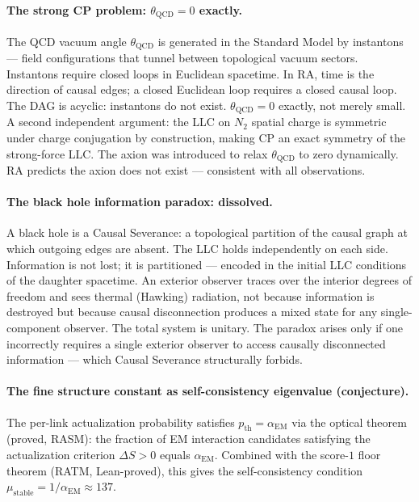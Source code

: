 \documentclass[11pt,a4paper]{article}
\begin{document}
\paragraph{The strong CP problem: $\theta_{\mathrm{QCD}} = 0$ exactly.}
The QCD vacuum angle $\theta_{\mathrm{QCD}}$ is generated in the Standard
Model by instantons — field configurations that tunnel between topological
vacuum sectors. Instantons require closed loops in Euclidean spacetime.
In RA, time is the direction of causal edges; a closed Euclidean loop
requires a closed causal loop. The DAG is acyclic: instantons do not exist.
$\theta_{\mathrm{QCD}} = 0$ exactly, not merely small. A second independent
argument: the LLC on $N_2$ spatial charge is symmetric under charge conjugation
by construction, making CP an exact symmetry of the strong-force LLC.
The axion was introduced to relax $\theta_{\mathrm{QCD}}$ to zero dynamically.
RA predicts the axion does not exist — consistent with all observations.

\paragraph{The black hole information paradox: dissolved.}
A black hole is a Causal Severance: a topological partition of the causal
graph at which outgoing edges are absent. The LLC holds independently on
each side. Information is not lost; it is partitioned — encoded in the
initial LLC conditions of the daughter spacetime. An exterior observer
traces over the interior degrees of freedom and sees thermal (Hawking)
radiation, not because information is destroyed but because causal
disconnection produces a mixed state for any single-component observer.
The total system is unitary. The paradox arises only if one incorrectly
requires a single exterior observer to access causally disconnected
information — which Causal Severance structurally forbids.

\paragraph{The fine structure constant as self-consistency eigenvalue (conjecture).}
The per-link actualization probability satisfies $p_{\mathrm{th}} = \alpha_{\mathrm{EM}}$
via the optical theorem (proved, RASM): the fraction of EM interaction candidates
satisfying the actualization criterion $\Delta S > 0$ equals $\alpha_{\mathrm{EM}}$.
Combined with the score-$1$ floor theorem (RATM, Lean-proved), this gives
the self-consistency condition $\mu_{\mathrm{stable}} = 1/\alpha_{\mathrm{EM}} \approx 137$.
\end{document}
